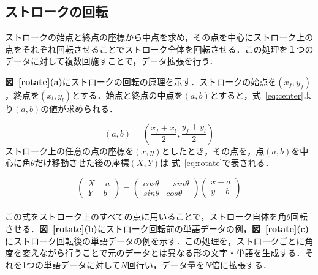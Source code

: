 \subsection{ストロークの回転}
ストロークの始点と終点の座標から中点を求め，その点を中心にストローク上の点をそれぞれ回転させることでストローク全体を回転させる．この処理を１つのデータに対して複数回施すことで，データ拡張を行う．

\textbf{図~\ref{rotate}(a)}にストロークの回転の原理を示す．ストロークの始点を$(x_f, y_f)$，終点を$(x_l, y_l)$とする．始点と終点の中点を$(a, b)$とすると，式~\ref{eq:center}より$(a, b)$の値が求められる．

\begin{equation}
  (a, b) = (\frac{x_f+x_l}{2}, \frac{y_f+y_l}{2})
  \label{eq:center}
\end{equation}
ストローク上の任意の点の座標を$(x, y)$としたとき，その点を，点$(a, b)$を中心に角$\theta$だけ移動させた後の座標$(X, Y)$は 式~\ref{eq:rotate}で表される．

\begin{equation}
  \left(
    \begin{array}{r}
        X-a \\
        Y-b
    \end{array}
    \right)
 = \left(
  \begin{array}{rr}
      cos\theta & -sin\theta \\
      sin\theta & cos\theta
  \end{array}
  \right)
  \left(
    \begin{array}{r}
        x-a \\
        y-b
    \end{array}
    \right)
  \label{eq:rotate}
\end{equation}
\\

この式をストローク上のすべての点に用いることで，ストローク自体を角$\theta$回転させる．\textbf{図~\ref{rotate}(b)}にストローク回転前の単語データの例，\textbf{図~\ref{rotate}(c)}にストローク回転後の単語データの例を示す．この処理を，ストロークごとに角度を変えながら行うことで元のデータとは異なる形の文字・単語を生成する．それを1つの単語データに対して$N$回行い，データ量を$N$倍に拡張する．

